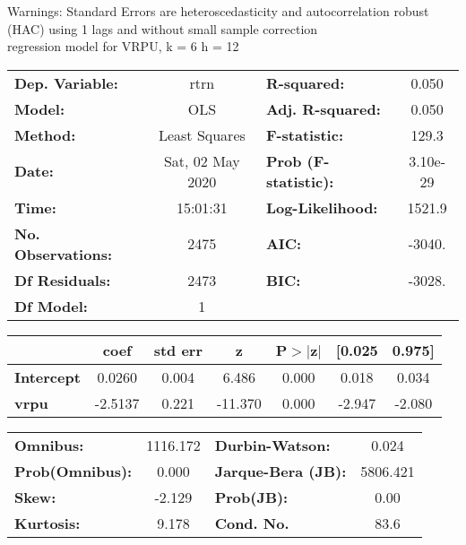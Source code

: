 Warnings: \newline
 [1] Standard Errors are heteroscedasticity and autocorrelation robust (HAC) using 1 lags and without small sample correction\\ 

regression model for VRPU, k = 6 h = 12\begin{center}
\begin{tabular}{lclc}
\toprule
\textbf{Dep. Variable:}    &       rtrn       & \textbf{  R-squared:         } &     0.050   \\
\textbf{Model:}            &       OLS        & \textbf{  Adj. R-squared:    } &     0.050   \\
\textbf{Method:}           &  Least Squares   & \textbf{  F-statistic:       } &     129.3   \\
\textbf{Date:}             & Sat, 02 May 2020 & \textbf{  Prob (F-statistic):} &  3.10e-29   \\
\textbf{Time:}             &     15:01:31     & \textbf{  Log-Likelihood:    } &    1521.9   \\
\textbf{No. Observations:} &        2475      & \textbf{  AIC:               } &    -3040.   \\
\textbf{Df Residuals:}     &        2473      & \textbf{  BIC:               } &    -3028.   \\
\textbf{Df Model:}         &           1      & \textbf{                     } &             \\
\bottomrule
\end{tabular}
\begin{tabular}{lcccccc}
                   & \textbf{coef} & \textbf{std err} & \textbf{z} & \textbf{P$> |$z$|$} & \textbf{[0.025} & \textbf{0.975]}  \\
\midrule
\textbf{Intercept} &       0.0260  &        0.004     &     6.486  &         0.000        &        0.018    &        0.034     \\
\textbf{vrpu}      &      -2.5137  &        0.221     &   -11.370  &         0.000        &       -2.947    &       -2.080     \\
\bottomrule
\end{tabular}
\begin{tabular}{lclc}
\textbf{Omnibus:}       & 1116.172 & \textbf{  Durbin-Watson:     } &    0.024  \\
\textbf{Prob(Omnibus):} &   0.000  & \textbf{  Jarque-Bera (JB):  } & 5806.421  \\
\textbf{Skew:}          &  -2.129  & \textbf{  Prob(JB):          } &     0.00  \\
\textbf{Kurtosis:}      &   9.178  & \textbf{  Cond. No.          } &     83.6  \\
\bottomrule
\end{tabular}
\end{center}

